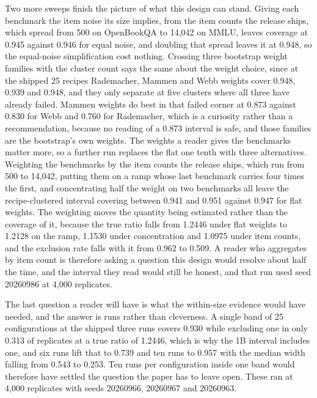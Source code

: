 Two more sweeps finish the picture of what this design can stand. Giving each benchmark the item noise its size implies, from the item counts the release ships, which spread from 500 on OpenBookQA to 14,042 on MMLU, leaves coverage at 0.945 against 0.946 for equal noise, and doubling that spread leaves it at 0.948, so the equal-noise simplification cost nothing. Crossing three bootstrap weight families with the cluster count says the same about the weight choice, since at the shipped 25 recipes Rademacher, Mammen and Webb weights cover 0.948, 0.939 and 0.948, and they only separate at five clusters where all three have already failed. Mammen weights do best in that failed corner at 0.873 against 0.830 for Webb and 0.760 for Rademacher, which is a curiosity rather than a recommendation, because no reading of a 0.873 interval is safe, and those families are the bootstrap's own weights. The weights a reader gives the benchmarks matter more, so a further run replaces the flat one tenth with three alternatives. Weighting the benchmarks by the item counts the release ships, which run from 500 to 14,042, putting them on a ramp whose last benchmark carries four times the first, and concentrating half the weight on two benchmarks all leave the recipe-clustered interval covering between 0.941 and 0.951 against 0.947 for flat weights. The weighting moves the quantity being estimated rather than the coverage of it, because the true ratio falls from 1.2446 under flat weights to 1.2128 on the ramp, 1.1530 under concentration and 1.0975 under item counts, and the exclusion rate falls with it from 0.962 to 0.509. A reader who aggregates by item count is therefore asking a question this design would resolve about half the time, and the interval they read would still be honest, and that run used seed 20260986 at 4,000 replicates.

The last question a reader will have is what the within-size evidence would have needed, and the answer is runs rather than cleverness. A single band of 25 configurations at the shipped three runs covers 0.930 while excluding one in only 0.313 of replicates at a true ratio of 1.2446, which is why the 1B interval includes one, and six runs lift that to 0.739 and ten runs to 0.957 with the median width falling from 0.543 to 0.253. Ten runs per configuration inside one band would therefore have settled the question the paper has to leave open. These ran at 4,000 replicates with seeds 20260966, 20260967 and 20260963.

